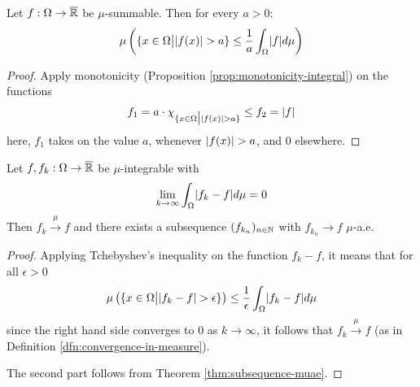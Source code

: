 \begin{thm}\label{thm:tchebychev-inequality}
  Let $f: \Omega \to \overline{\mathbb{R}}$ be $\mu$-summable. Then for every $a > 0$:
  \begin{align*}
    \mu\left(
      \{x \in \Omega \big\vert \abs{f(x)} > a\}
      \leq \frac{1}{a} \int_{\Omega} \abs{f} d \mu
    \right)
  \end{align*}
\end{thm}
\begin{proof}
  Apply monotonicity (Proposition \ref{prop:monotonicity-integral}) on the functions
  \begin{align*}
      f_1 = a \cdot \chi_{\{x \in \Omega \big\vert \vert f(x)\vert > a\}} \leq f_2 = \vert f\vert
  \end{align*}
  here, $f_1$ takes on the value $a$, whenever $\vert f(x)\vert > a$, and $0$ elsewhere.
\end{proof}

\begin{cor}[]\label{cor:reverse-convergence}
Let $f, f_k: \Omega \to \overline{\mathbb{R}}$ be $\mu$-integrable with
\begin{align*}
  \lim_{k \to \infty} \int_{\Omega} \abs{f_k - f} d \mu = 0
\end{align*}
Then $f_k \stackrel{\mu}{\to} f$ and there exists a subsequence $(f_{k_n})_{n \in \mathbb{N}}$ with $f_{k_n} \to f$ $\mu$-a.e.
\end{cor}
\begin{proof}
Applying Tchebyshev's inequality on the function $f_k - f$, it means that for all $\epsilon > 0$
\begin{align*}
  \mu\left(
    \{x \in \Omega \big\vert \abs{f_k - f} > \epsilon\}
  \right)
    \leq \frac{1}{\epsilon} \int_{\Omega} \abs{f_k - f} d \mu
\end{align*}
since the right hand side converges to $0$ as $k \to  \infty$, it follows that $f_k \stackrel{\mu}{\to} f$ (as in Definition \ref{dfn:convergence-in-measure}).

The second part follows from Theorem \ref{thm:subsequence-muae}.
\end{proof}
